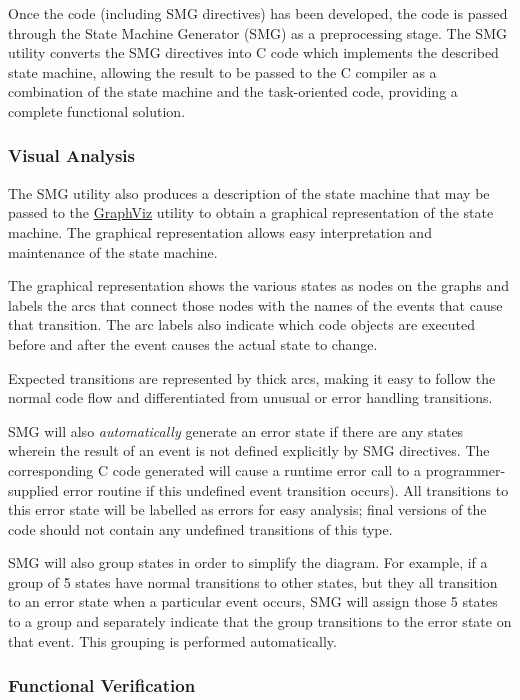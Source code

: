 Once the code (including SMG directives) has been developed, the code
is passed through the State Machine Generator (SMG) as a preprocessing
stage.  The SMG utility converts the SMG directives into C code which
implements the described state machine, allowing the result to be
passed to the C compiler as a combination of the state machine and the
task-oriented code, providing a complete functional solution.

\subsubsection{Visual Analysis}

The SMG utility also produces a description of the state machine that
may be passed to the \hyperlink{GraphViz}{GraphViz} utility to obtain a
graphical representation of the state machine.  The graphical
representation allows easy interpretation and maintenance of the state
machine.

The graphical representation shows the various states as nodes on the
graphs and labels the arcs that connect those nodes with the names of
the events that cause that transition.  The arc labels also indicate
which code objects are executed before and after the event causes the
actual state to change.

Expected transitions are represented by thick arcs, making it easy to
follow the normal code flow and differentiated from unusual or error
handling transitions.

SMG will also {\em automatically} generate an error state if there are
any states wherein the result of an event is not defined explicitly by
SMG directives.  The corresponding C code generated will cause a
runtime error call to a programmer-supplied error routine if this
undefined event transition occurs).  All transitions to this error
state will be labelled as errors for easy analysis; final versions of
the code should not contain any undefined transitions of this type.

SMG will also group states in order to simplify the diagram.  For
example, if a group of 5 states have normal transitions to other
states, but they all transition to an error state when a particular
event occurs, SMG will assign those 5 states to a group and separately
indicate that the group transitions to the error state on that event.
This grouping is performed automatically.

\subsubsection{Functional Verification}

